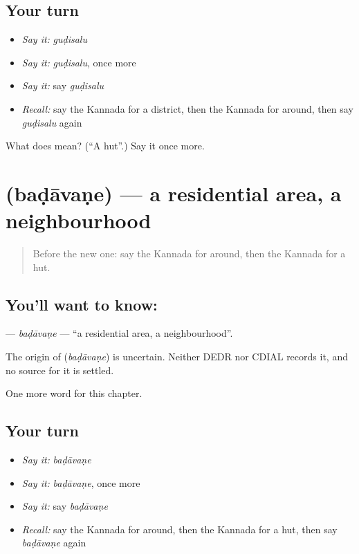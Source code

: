 \subsection*{Your turn}
\begin{itemize}
\raggedright
  \item \emph{Say it:} \emph{guḍisalu}
  \item \emph{Say it:} \emph{guḍisalu}, once more
  \item \emph{Say it:} say \emph{guḍisalu}
  \item \emph{Recall:} say the Kannada for a district, then the Kannada for around, then say \emph{guḍisalu} again
\end{itemize}

\begin{tcolorbox}[breakable,colback=teal!4,colframe=teal!35!black,title={Before you move on}]
What does  mean? (\textquotedblleft{}A hut\textquotedblright{}.) Say it once more.
\end{tcolorbox}
\section[\texorpdfstring{\kn{ಬಡಾವಣೆ} (baḍāvaṇe)}{ಬಡಾವಣೆ (baḍāvaṇe)}]{ (baḍāvaṇe) — a residential area, a neighbourhood}

\label{lesson:KA-C250-badavane}



\begin{quote}
Before the new one: say the Kannada for around, then the Kannada for a hut.
\end{quote}

\subsection*{You'll want to know: }
\textbf{} — \emph{baḍāvaṇe} — \textquotedblleft{}a residential area, a neighbourhood\textquotedblright{}.

\begin{cousinweb}
The origin of \textbf{} (\emph{baḍāvaṇe}) is uncertain. Neither DEDR nor CDIAL records it, and no source for it is settled.
\end{cousinweb}

\begin{grammarlens}[title={What you've built}]
One more word for this chapter.
\end{grammarlens}

\subsection*{Your turn}
\begin{itemize}
\raggedright
  \item \emph{Say it:} \emph{baḍāvaṇe}
  \item \emph{Say it:} \emph{baḍāvaṇe}, once more
  \item \emph{Say it:} say \emph{baḍāvaṇe}
  \item \emph{Recall:} say the Kannada for around, then the Kannada for a hut, then say \emph{baḍāvaṇe} again
\end{itemize}

